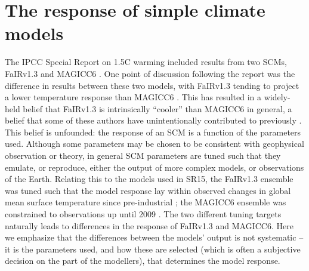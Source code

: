 \documentclass[gmd, manuscript]{copernicus}
\begin{document}
\section{The response of simple climate models} \label{SCM_response_discuss}
The IPCC Special Report on 1.5\textdegree C warming \citep{IPCC2018} included results from two SCMs, FaIRv1.3 \citep{Smith2018} and MAGICC6 \citep{Meinshausen2011}. One point of discussion following the report was the difference in results between these two models, with FaIRv1.3 tending to project a lower temperature response than MAGICC6 \citep{Huppmann:2018:scenario-data}. This has resulted in a widely-held belief that FaIRv1.3 is intrinsically ``cooler'' than MAGICC6 in general, a belief that some of these authors have unintentionally contributed to previously \citep{Leach2018}. This belief is unfounded: the response of an SCM is a function of the parameters used. Although some parameters may be chosen to be consistent with geophysical observation or theory, in general SCM parameters are tuned such that they emulate, or reproduce, either the output of more complex models, or observations of the Earth. Relating this to the models used in SR15, the FaIRv1.3 ensemble was tuned such that the model response lay within observed changes in global mean surface temperature since pre-industrial \citep{Smith2018,Cowtan2014}; the MAGICC6 ensemble was constrained to observations up until 2009 \citep{Meinshausen2009}. The two different tuning targets naturally leads to differences in the response of FaIRv1.3 and MAGICC6. Here we emphasize that the differences between the models' output is not systematic -- it is the parameters used, and how these are selected (which is often a subjective decision on the part of the modellers), that determines the model response.\\\\
%
\end{document}
